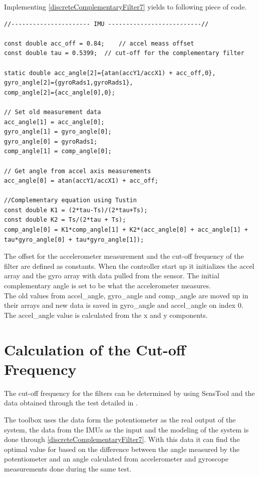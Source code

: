 Implementing \eqref{discreteComplementaryFilter7} yields to following piece of code. 

\begin{lstlisting}[caption  = {Code for the implementation of the complementary filter in C\texttt{++}},
label    = codeCompFilter ]
//---------------------- IMU --------------------------//

const double acc_off = 0.84;  	// accel meass offset
const double tau = 0.5399;	// cut-off for the complementary filter

static double acc_angle[2]={atan(accY1/accX1) + acc_off,0},
gyro_angle[2]={gyroRads1,gyroRads1},
comp_angle[2]={acc_angle[0],0};

// Set old measurement data
acc_angle[1] = acc_angle[0];
gyro_angle[1] = gyro_angle[0];
gyro_angle[0] = gyroRads1;
comp_angle[1] = comp_angle[0];

// Get angle from accel axis measurements
acc_angle[0] = atan(accY1/accX1) + acc_off;

//Complementary equation using Tustin
const double K1 = (2*tau-Ts)/(2*tau+Ts);
const double K2 = Ts/(2*tau + Ts);
comp_angle[0] = K1*comp_angle[1] + K2*(acc_angle[0] + acc_angle[1] + tau*gyro_angle[0] + tau*gyro_angle[1]);
\end{lstlisting}
The offset for the accelerometer measurement and the cut-off frequency of the filter are defined as constants. When the controller start up it initializes the accel array and the gyro array with data pulled from the sensor. The initial complementary angle is set to be what the accelerometer measures.\\
The old values from accel\_angle, gyro\_angle and comp\_angle are moved up in their arrays and new data is saved in gyro\_angle and accel\_angle on index 0. The accel\_angle value is calculated from the x and y components. 

\section{Calculation of the Cut-off Frequency}
The cut-off frequency for the filters can be determined by using SensTool and the data obtained through the test detailed in . 

The toolbox uses the data form the potentiometer as the real output of the system, the data from the IMUs as the input and the modeling of the system is done through \eqref{discreteComplementaryFilter7}. With this data it can find the optimal value for \si{\tau} based on the difference between the angle measured by the potentiometer and an angle calculated from accelerometer and gyroscope measurements done during the same test.

